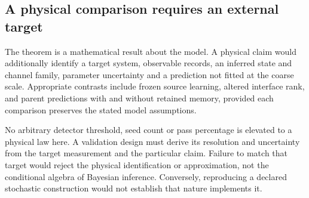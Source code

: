 \subsection{A physical comparison requires an external target}
The theorem is a mathematical result about the model. A physical claim would additionally identify a target system, observable records, an inferred state and channel family, parameter uncertainty and a prediction not fitted at the coarse scale. Appropriate contrasts include frozen source learning, altered interface rank, and parent predictions with and without retained memory, provided each comparison preserves the stated model assumptions.

No arbitrary detector threshold, seed count or pass percentage is elevated to a physical law here. A validation design must derive its resolution and uncertainty from the target measurement and the particular claim. Failure to match that target would reject the physical identification or approximation, not the conditional algebra of Bayesian inference. Conversely, reproducing a declared stochastic construction would not establish that nature implements it.

